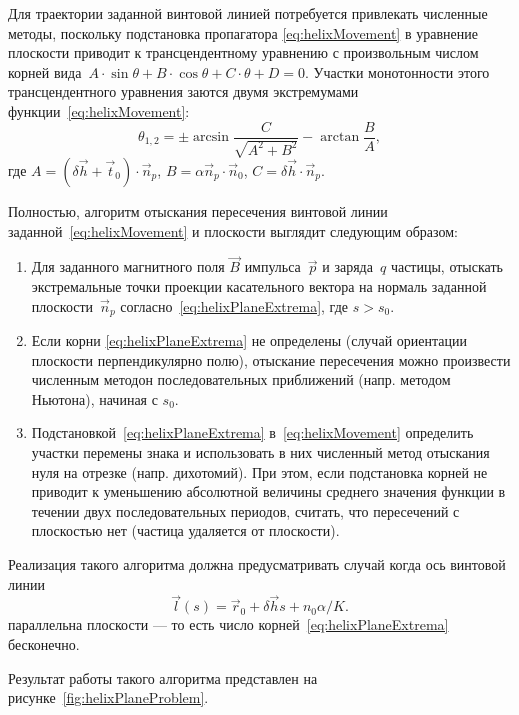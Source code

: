 Для траектории заданной винтовой линией потребуется привлекать
численные методы, поскольку подстановка пропагатора \eqref{eq:helixMovement}
в уравнение плоскости приводит к трансцендентному уравнению с
произвольным числом корней
вида~$A \cdot \sin \theta + B \cdot \cos \theta + C \cdot \theta + D = 0$.
Участки монотонности этого трансцендентного уравнения заются двумя экстремумами
функции~\eqref{eq:helixMovement}:
\begin{equation}
    \theta_{1,2} = \pm \arcsin \frac{C}{\sqrt{A^2 + B^2}} - \arctan{\frac{B}{A}},
    \label{eq:helixPlaneExtrema}
\end{equation}
где $A = (\delta \vec{h} + \vec{t}_0) \cdot \vec{n}_p$,
$B = \alpha \vec{n}_p \cdot \vec{n}_0$, $C = \delta \vec{h} \cdot \vec{n}_p$.

Полностью, алгоритм отыскания пересечения винтовой линии
заданной~\eqref{eq:helixMovement} и плоскости выглядит следующим образом:
\begin{enumerate}
    \item Для заданного магнитного поля $\vec{B}$ импульса~$\vec{p}$ и
    заряда~$q$ частицы, отыскать экстремальные точки проекции касательного
    вектора на нормаль заданной плоскости~$\vec{n}_p$
    согласно~\eqref{eq:helixPlaneExtrema}, где $s > s_0$.
    \item Если корни \eqref{eq:helixPlaneExtrema} не определены (случай
    ориентации плоскости перпендикулярно полю), отыскание пересечения можно
    произвести численным методон последовательных приближений (напр. методом
    Ньютона), начиная с $s_0$.
    \item Подстановкой~\eqref{eq:helixPlaneExtrema} в~\eqref{eq:helixMovement}
    определить участки перемены знака и использовать в них численный метод
    отыскания нуля на отрезке (напр. дихотомий). При этом, если подстановка
    корней не приводит к уменьшению абсолютной величины среднего значения
    функции в течении двух последовательных периодов, считать, что пересечений
    с плоскостью нет (частица удаляется от плоскости).
\end{enumerate}
Реализация такого алгоритма должна предусматривать случай когда ось винтовой
линии
\begin{equation}
    \vec{l}(s) = \vec{r}_0 + \delta \vec{h} s + n_0 \alpha / K.
    \label{eq:helixAxis}
\end{equation}
параллельна плоскости --- то есть число корней~\eqref{eq:helixPlaneExtrema}
бесконечно.

Результат работы такого алгоритма представлен на рисунке~\ref{fig:helixPlaneProblem}.


